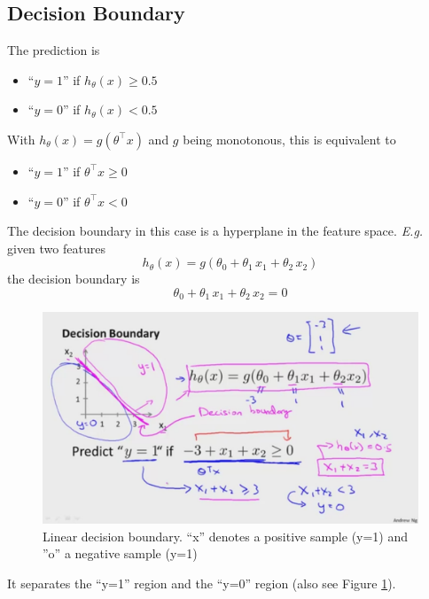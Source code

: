 \documentclass[a4paper,twoside,10pt]{article}
\begin{document}
\subsection{Decision Boundary}
The prediction is
\begin{itemize}
  \item ``$y=1$'' if $h_\theta(x)\ge 0.5$
  \item ``$y=0$'' if $h_\theta(x)<0.5$
\end{itemize}
With $h_\theta(x)=g(\theta^\top x)$ and $g$ being monotonous, this is equivalent to
\begin{itemize}
  \item ``$y=1$'' if $\theta^\top x\ge 0$
  \item ``$y=0$'' if $\theta^\top x< 0$
\end{itemize}
The decision boundary in this case is a hyperplane in the feature space. \emph{E.g.} given two features
\begin{equation*}
  h_\theta(x)=g(\theta_0+\theta_1\,x_1+\theta_2\,x_2)
\end{equation*}
the decision boundary is
\begin{equation*}
  \theta_0+\theta_1\,x_1+\theta_2\,x_2=0
\end{equation*}
\begin{figure}[htbp]
  \begin{center}
    \includegraphics[width=.6\textwidth]{decisionboundary}
    \caption[Linear decision boundary]{Linear decision boundary. ``x'' denotes a positive sample (y=1) and ''o'' a negative sample (y=1)\citep{andrewng}\label{fig:decisionboundary}}
  \end{center}
\end{figure}
It separates the ``y=1'' region and the ``y=0'' region (also see Figure \ref{fig:decisionboundary}).
\end{document}
